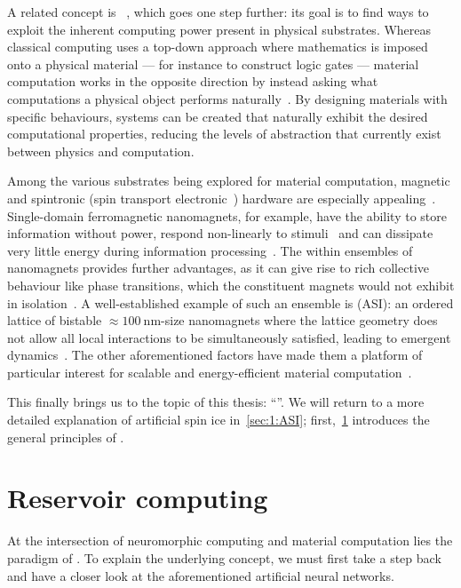 A related concept is ~\cite{NeglectedPillar}, which goes one step further: its goal is to find ways to exploit the inherent computing power present in physical substrates.
Whereas classical computing uses a top-down approach where mathematics is imposed onto a physical material --- for instance to construct logic gates --- material computation works in the opposite direction by instead asking what computations a physical object performs naturally~\cite{RC_ASI}.
By designing materials with specific behaviours, systems can be created that naturally exhibit the desired computational properties, reducing the levels of abstraction that currently exist between physics and computation. \par
Among the various substrates being explored for material computation, magnetic and spintronic (spin transport electronic~\cite{Spintronics}) hardware are especially appealing~\cite{grollier2020neuromorphic,NeuromorphicSpintronicsProspect,QuantumNeuromorphicOpportunities}.
Single-domain ferromagnetic nanomagnets, for example, have the ability to store information without power, respond non-linearly to stimuli~\cite{NeuromorphicSpintronics} and can dissipate very little energy during information processing~\cite{ThermodynamicLimitsComputation,SpintronicsEnergyEfficientComputing}.
The  within ensembles of nanomagnets provides further advantages, as it can give rise to rich collective behaviour like phase transitions, which the constituent magnets would not exhibit in isolation~\cite{NeuromorphicSpintronicsProspect,RC_ASI}.
A well-established example of such an ensemble is  (ASI): an ordered lattice of bistable $\approx \SI{100}{\nano\metre}$-size nanomagnets where the lattice geometry does not allow all local interactions to be simultaneously satisfied, leading to emergent dynamics~\cite{ASIpyrochlores}.
The other aforementioned factors have made them a platform of particular interest for scalable and energy-efficient material computation~\cite{PhD_Stromberg}. \par
This finally brings us to the topic of this thesis: ``\emph{\phdtitle}''.
We will return to a more detailed explanation of artificial spin ice in~\cref{sec:1:ASI}; first,~\cref{sec:1:RC} introduces the general principles of .

\newpage
\section{Reservoir computing}\label{sec:1:RC}
At the intersection of neuromorphic computing and material computation lies the paradigm of .
To explain the underlying concept, we must first take a step back and have a closer look at the aforementioned artificial neural networks.

